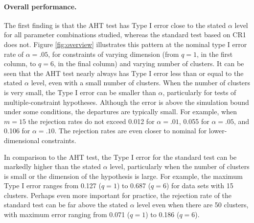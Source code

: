 \documentclass[12pt]{article}\usepackage[]{graphicx}\usepackage[]{color}
\begin{document}
\paragraph{Overall performance.} The first finding is that the AHT test has Type I error close to the stated $\alpha$ level for all parameter combinations studied, whereas the standard test based on CR1 does not. 
Figure \ref{fig:overview} illustrates this pattern at the nominal type I error rate of $\alpha = .05$, for constraints of varying dimension (from $q = 1$, in the first column, to $q = 6$, in the final column) and varying number of clusters.
It can be seen that the AHT test nearly always has Type I error less than or equal to the stated $\alpha$ level, even with a small number of clusters.
When the number of clusters is very small, the Type I error can be smaller than $\alpha$, particularly for tests of multiple-constraint hypotheses. 
Although the error is above the simulation bound under some conditions, the departures are typically small. For example, when $m = 15$ the rejection rates do not exceed 0.012 for $\alpha = .01$, 0.055 for $\alpha = .05$, and 0.106 for $\alpha = .10$.
The rejection rates are even closer to nominal for lower-dimensional constraints.

In comparison to the AHT test, the Type I error for the standard test can be markedly higher than the stated $\alpha$ level, particularly when the number of clusters is small or the dimension of the hypothesis is large. 
For example, the maximum Type I error ranges from 0.127 ($q = 1$) to 0.687 ($q = 6$) for data sets with 15 clusters.
Perhaps even more important for practice, the rejection rate of the standard test can be far above the stated $\alpha$ level even when there are 50 clusters, with maximum error ranging from 0.071 ($q = 1$) to 0.186 ($q = 6$). 
\end{document}
